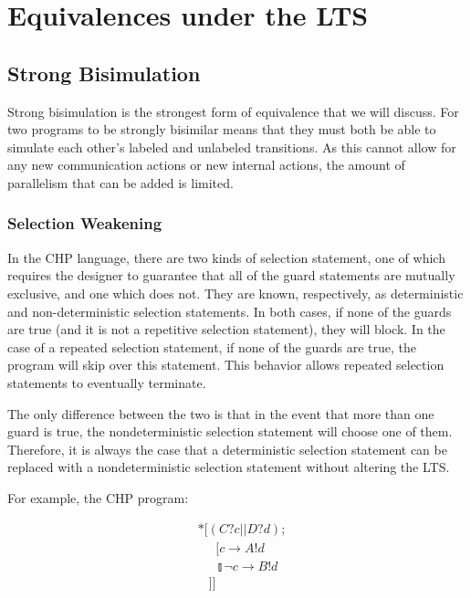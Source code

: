 \documentclass[times, 10pt]{article}
\begin{document}
\section{Equivalences under the LTS}

 
\subsection{Strong Bisimulation}

Strong bisimulation is the strongest form of equivalence that we will discuss.
For two programs to be strongly bisimilar means that they must both be able to
simulate each other's labeled and unlabeled transitions. As this cannot allow
for any new communication actions or new internal actions, the amount of
parallelism that can be added is limited.

\subsubsection{Selection Weakening}

In the CHP language, there are two kinds of selection statement, one of which
requires the designer to guarantee that all of the guard statements are mutually
exclusive, and one which does not. They are known, respectively, as
deterministic and non-deterministic selection statements. In both cases, if none
of the guards are true (and it is not a repetitive selection statement), they
will block. In the case of a repeated selection statement, if none of the guards
are true, the program will skip over this statement. This behavior allows
repeated selection statements to eventually terminate.

The only difference between the two is that in the event that more than one
guard is true, the nondeterministic selection statement will choose one of them.
Therefore, it is always the case that a deterministic selection statement can be
replaced with a nondeterministic selection statement without altering the LTS.

For example, the CHP program:

\begin{align*}
&*[(C?c || D?d); \\
& \;\;\;\;\;[ c \rightarrow A!d \\
& \;\;\;\;\;\talloblong \lnot c \rightarrow B!d \\
& \;\;\;]] \\
\end{align*}
\end{document}
